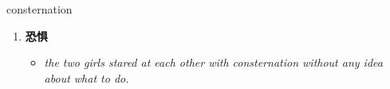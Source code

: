 
\begin{frame}
{\huge consternation}
\begin{center}
\begin{enumerate}\Large
  \item \textbf{恐惧}
  \begin{itemize}
    \item \em{\Large{the two girls stared at each other with consternation without any idea about what to do.}}
  \end{itemize}
\end{enumerate}
\end{center}
\end{frame}
